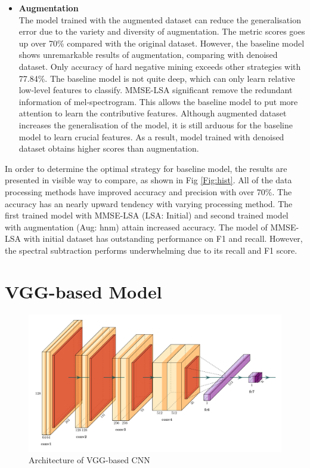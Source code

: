 \begin{itemize}[leftmargin=*]
    \item \textbf{Augmentation}\\
    The model trained with the augmented dataset can reduce the generalisation error due to the variety and diversity of augmentation. The metric scores goes up over 70\% compared with the original dataset. However, the baseline model shows unremarkable results of augmentation, comparing with denoised dataset. Only accuracy of hard negative mining exceeds other strategies with 77.84\%. The baseline model is not quite deep, which can only learn relative low-level features to classify. MMSE-LSA significant remove the redundant information of mel-spectrogram. This allows the baseline model to put more attention to learn the contributive features. Although augmented dataset increases the generalisation of the model, it is still arduous for the baseline model to learn crucial features. As a result, model trained with denoised dataset obtains higher scores than augmentation. 
\end{itemize} 

In order to determine the optimal strategy for baseline model, the results are presented in visible way to compare, as shown in Fig \ref{Fig:hist}. All of the data processing methods have improved accuracy and precision with over 70\%. The accuracy has an nearly upward tendency with varying processing method. The first trained model with MMSE-LSA (LSA: Initial) and second trained model with augmentation (Aug: hnm) attain increased accuracy. The model of MMSE-LSA with initial dataset has outstanding performance on F1 and recall. However, the spectral subtraction performs underwhelming due to its recall and F1 score.
\section{VGG-based Model}
\begin{figure}[!htb]
\centering
\includegraphics[scale=0.55]{Figs/chap4/vgg16.pdf}
\caption{Architecture of VGG-based CNN}
\label{fig:vgg}
\end{figure}
